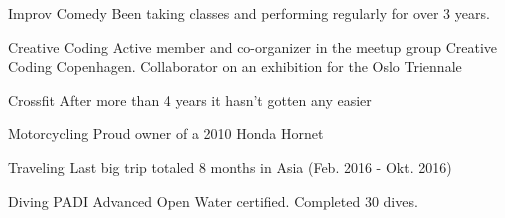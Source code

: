 


\begin{cvskills}


\cvskill
{Improv Comedy} %
{Been taking classes and performing regularly for over 3 years.}


\cvskill
{Creative Coding} %
{Active member and co-organizer in the meetup group Creative Coding Copenhagen. Collaborator on an exhibition for the Oslo Triennale} %


\cvskill
{Crossfit} %
{After more than 4 years it hasn't gotten any easier} %


\cvskill
{Motorcycling} %
{Proud owner of a 2010 Honda Hornet} %


\cvskill
{Traveling} %
{Last big trip totaled 8 months in Asia (Feb. 2016 - Okt. 2016)} %


\cvskill
{Diving} %
{PADI Advanced Open Water certified. Completed 30 dives.} %


\end{cvskills}
